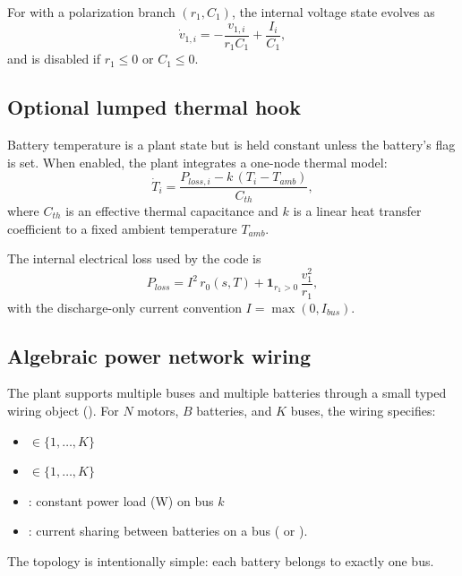 For  with a polarization branch $(r_1, C_1)$, the internal voltage state evolves as
\begin{equation}
  \dot{v}_{1,i} = -\frac{v_{1,i}}{r_1 C_1} + \frac{I_i}{C_1},
\end{equation}
and is disabled if $r_1\le 0$ or $C_1\le 0$.

\subsection{Optional lumped thermal hook}
\label{sec:battery-thermal}

Battery temperature is a plant state but is held constant unless the battery's  flag is set. When enabled, the plant integrates a one-node thermal model:
\begin{equation}
  \dot{T}_i = \frac{P_{loss,i} - k\,(T_i - T_{amb})}{C_{th}},
\end{equation}
where $C_{th}$ is an effective thermal capacitance and $k$ is a linear heat transfer coefficient to a fixed ambient temperature $T_{amb}$.

The internal electrical loss used by the code is
\begin{equation}
  P_{loss} = I^2\,r_0(s,T) + \mathbf{1}_{r_1>0}\,\frac{v_1^2}{r_1},
\end{equation}
with the discharge-only current convention $I=\max(0,I_{bus})$.

\subsection{Algebraic power network wiring}

The plant supports multiple buses and multiple batteries through a small typed wiring object  (). For $N$ motors, $B$ batteries, and $K$ buses, the wiring specifies:
\begin{itemize}[leftmargin=*,itemsep=2pt]
  \item {} $\in\{1,\dots,K\}$
  \item {} $\in\{1,\dots,K\}$
  \item {}: constant power load (W) on bus $k$
  \item {}: current sharing between batteries on a bus ( or ).
\end{itemize}
The topology is intentionally simple: each battery belongs to exactly one bus.

